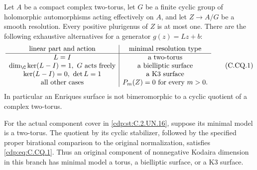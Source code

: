 
\begin{proposition}\label{cdp:st:C.2.UN.23}
Let $A$ be a compact complex two-torus, let $G$ be a finite
cyclic group of holomorphic automorphisms acting effectively
on $A$, and let $Z\to A/G$ be a smooth resolution.
Every positive plurigenus of $Z$ is at most one. There are
the following exhaustive alternatives for a generator
$g(z)=Lz+b$:
\[
\begin{array}{c|c}
\text{linear part and action}&\text{minimal resolution type}\\ \hline
L=I&\text{a two-torus}\\
\dim_{\C}\ker(L-I)=1,\ G\text{ acts freely}
   &\text{a bielliptic surface}\\
\ker(L-I)=0,\ \det L=1&\text{a K3 surface}\\
\text{all other cases}&P_m(Z)=0\text{ for every }m>0 .
\end{array}                                                    \tag{C.CQ.1}\label{cdp:eq:C.CQ.1}
\]
In particular an Enriques surface is not bimeromorphic to
a cyclic quotient of a complex two-torus.

For the actual component cover in \ref{cdp:st:C.2.UN.16}, suppose its
minimal model is a two-torus. The quotient by its cyclic
stabilizer, followed by the specified proper birational
comparison to the original normalization, satisfies
\eqref{cdp:eq:C.CQ.1}. Thus an original component of nonnegative
Kodaira dimension in this branch has minimal model a
torus, a bielliptic surface, or a K3 surface.
\end{proposition}

